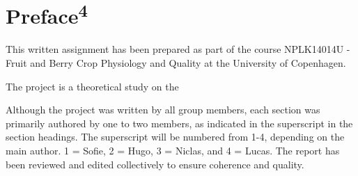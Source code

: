 \setlength{\headheight}{12.71342pt}
\addtolength{\topmargin}{-0.71342pt}


\section*{Preface\textsuperscript{4}}
This written assignment has been prepared as part of the course NPLK14014U - Fruit and Berry Crop Physiology and Quality at the University of Copenhagen. %

\vspace{1em}
The project is a theoretical study on the %

\vspace{1em}
Although the project was written by all group members, each section was primarily authored by one to two members, as indicated in the superscript in the section headings. The superscript will be numbered from 1-4, depending on the main author. 1 = Sofie, 2 = Hugo, 3 = Niclas, and 4 = Lucas. The report has been reviewed and edited collectively to ensure coherence and quality.


